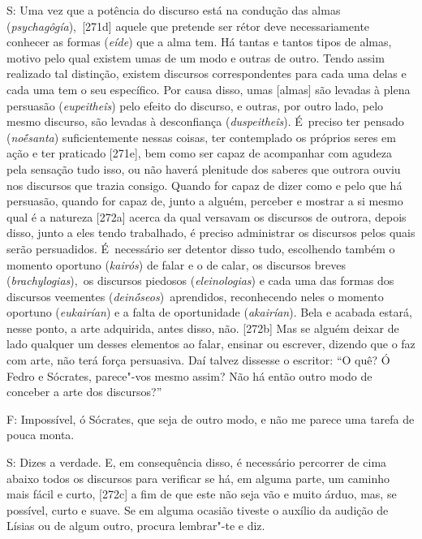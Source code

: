 S: Uma vez que a potência do discurso está na condução das almas
(\emph{psychagôgía}),\emph{~}[271d] aquele que pretende ser rétor
deve necessariamente conhecer as formas (\emph{eíde}) que a alma tem. Há
tantas e tantos tipos de almas, motivo pelo qual existem umas de um modo
e outras de outro. Tendo assim realizado tal distinção, existem
discursos correspondentes para cada uma delas e cada uma tem o seu
específico. Por causa disso, umas [almas] são levadas à plena
persuasão (\emph{eupeitheîs}) pelo efeito do discurso, e outras, por
outro lado, pelo mesmo discurso, são levadas à desconfiança
(\emph{duspeitheîs}). É~preciso ter pensado (\emph{noḗsanta})
suficientemente nessas coisas, ter contemplado os próprios seres em ação
e ter praticado [271e], bem como ser capaz de acompanhar com agudeza
pela sensação tudo isso, ou não haverá plenitude dos saberes que outrora
ouviu nos discursos que trazia consigo. Quando for capaz de dizer como e
pelo que há persuasão, quando for capaz de, junto a alguém, perceber e
mostrar a si mesmo qual é a natureza [272a] acerca da qual versavam
os discursos de outrora, depois disso, junto a eles tendo trabalhado, é
preciso administrar os discursos pelos quais serão persuadidos. É~necessário ser detentor disso tudo, escolhendo também o momento oportuno
(\emph{kairós}) de falar e o de calar, os discursos breves
(\emph{brachylogias}),\emph{~}os discursos piedosos
(\emph{eleinologias}) e cada uma das formas dos discursos veementes
(\emph{deinṓseos})\emph{~}aprendidos, reconhecendo neles o momento
oportuno (\emph{eukairían}) e a falta de oportunidade (\emph{akairían}).
Bela e acabada estará, nesse ponto, a arte adquirida, antes disso, não.
[272b] Mas se alguém deixar de lado qualquer um desses elementos ao
falar, ensinar ou escrever, dizendo que o faz com arte, não terá força
persuasiva. Daí talvez dissesse o escritor: ``O quê? Ó Fedro e Sócrates,
parece"-vos mesmo assim? Não há então outro modo de conceber a arte dos
discursos?''

 

F: Impossível, ó Sócrates, que seja de outro modo, e não me parece uma
tarefa de pouca monta.

 

S: Dizes a verdade. E, em consequência disso, é necessário percorrer de
cima abaixo todos os discursos para verificar se há, em alguma parte, um
caminho mais fácil e curto, [272c] a fim de que este não seja vão e
muito árduo, mas, se possível, curto e suave. Se em alguma ocasião
tiveste o auxílio da audição de Lísias ou de algum outro, procura
lembrar"-te e diz.

